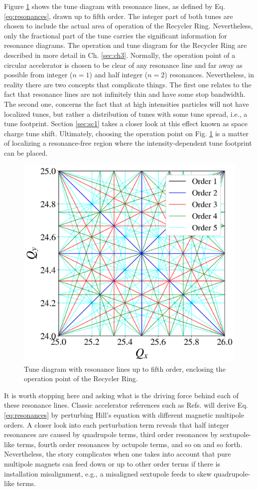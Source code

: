 Figure \ref{fig:tunediagram} shows the tune diagram with resonance lines, as defined by Eq. \ref{eq:resonances}, drawn up to fifth order. The integer part of both tunes are chosen to include the actual area of operation of the Recycler Ring. Nevertheless, only the fractional part of the tune carries the significant information for resonance diagrams. The operation and tune diagram for the Recycler Ring are described in more detail in Ch. \ref{sec:ch3}. Normally, the operation point of a circular accelerator is chosen to be clear of any resonance line and far away as possible from integer ($n=1$) and half integer ($n=2$) resonances. Nevertheless, in reality there are two concepts that complicate things. The first one relates to the fact that resonance lines are not infinitely thin and have some stop bandwidth. The second one, concerns the fact that at high intensities particles will not have localized tunes, but rather a distribution of tunes with some tune spread, i.e., a tune footprint. Section \ref{sec:sc1} takes a closer look at this effect known as space charge tune shift. Ultimately, choosing the operation point on Fig. \ref{fig:tunediagram} is a matter of localizing a resonance-free region where the intensity-dependent tune footprint can be placed.   
\begin{figure}[H]
    \centering
    \includegraphics[width=0.8\columnwidth]{chapter2/tunediagram.png}
    \caption{Tune diagram with resonance lines up to fifth order, enclosing the operation point of the Recycler Ring.}
    \label{fig:tunediagram}
 \end{figure}
It is worth stopping here and asking what is the driving force behind each of these resonance lines. Classic accelerator references such as Refs. \cite{wolski,Wiedemann2015,sylee} will derive Eq. \ref{eq:resonances} by perturbing Hill's equation with different magnetic multipole orders. A closer look into each perturbation term reveals that half integer resonances are caused by quadrupole terms, third order resonances by sextupole-like terms, fourth order resonances by octupole terms, and so on and so forth. Nevertheless, the story complicates when one takes into account that pure multipole magnets can feed down or up to other order terms if there is installation misalignment, e.g., a misaligned sextupole feeds to skew quadrupole-like terms.        

